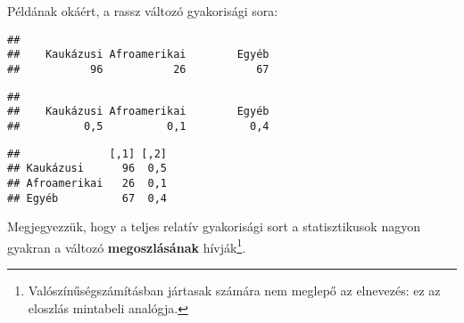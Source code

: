 \documentclass[]{book}
\newenvironment{Shaded}{\begin{snugshade}}{\end{snugshade}}
\newcommand{\KeywordTok}[1]{\textcolor[rgb]{0.13,0.29,0.53}{\textbf{#1}}}
\newcommand{\DataTypeTok}[1]{\textcolor[rgb]{0.13,0.29,0.53}{#1}}
\newcommand{\DecValTok}[1]{\textcolor[rgb]{0.00,0.00,0.81}{#1}}
\newcommand{\StringTok}[1]{\textcolor[rgb]{0.31,0.60,0.02}{#1}}
\newcommand{\OperatorTok}[1]{\textcolor[rgb]{0.81,0.36,0.00}{\textbf{#1}}}
\newcommand{\NormalTok}[1]{#1}
\let\rmarkdownfootnote\footnote%
\def\footnote{\protect\rmarkdownfootnote}
\begin{document}
Példának okáért, a rassz változó gyakorisági sora:

\begin{Shaded}
\end{Shaded}

\begin{verbatim}
## 
##    Kaukázusi Afroamerikai        Egyéb 
##           96           26           67
\end{verbatim}

\begin{Shaded}
\end{Shaded}

\begin{verbatim}
## 
##    Kaukázusi Afroamerikai        Egyéb 
##          0,5          0,1          0,4
\end{verbatim}

\begin{Shaded}
\end{Shaded}

\begin{verbatim}
##              [,1] [,2]
## Kaukázusi      96  0,5
## Afroamerikai   26  0,1
## Egyéb          67  0,4
\end{verbatim}

Megjegyezzük, hogy a teljes relatív gyakorisági sort a statisztikusok
nagyon gyakran a változó \textbf{megoszlásának}
hívják\footnote{Valószínűségszámításban jártasak számára nem meglepő az elnevezés: ez az eloszlás mintabeli analógja.}.
\end{document}
